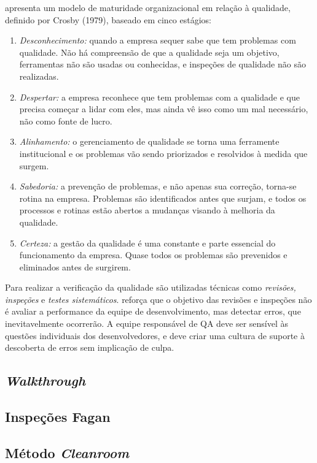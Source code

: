 \documentclass[
	12pt,				%
	openright,			%
	oneside,			%
	a4paper,			%
	english,			%
	brazil,				%
	]{abntex2}
\begin{document}
 apresenta um modelo de maturidade organizacional em relação à qualidade, definido por Crosby (1979), baseado em cinco estágios:
\begin{enumerate}
    \item \emph{Desconhecimento:} quando a empresa sequer sabe que tem problemas com qualidade. Não há compreensão de que a qualidade seja um objetivo, ferramentas não são usadas ou conhecidas, e inspeções de qualidade não são realizadas.
    \item \emph{Despertar:} a empresa reconhece que tem problemas com a qualidade e que precisa começar a lidar com eles, mas ainda vê isso como um mal necessário, não como fonte de lucro.
    \item \emph{Alinhamento:} o gerenciamento de qualidade se torna uma ferramente institucional e os problemas vão sendo priorizados e resolvidos à medida que surgem.
    \item \emph{Sabedoria:} a prevenção de problemas, e não apenas sua correção, torna-se rotina na empresa. Problemas são identificados antes que surjam, e todos os processos e rotinas estão abertos a mudanças visando à melhoria da qualidade.
    \item \emph{Certeza:} a gestão da qualidade é uma constante e parte essencial do funcionamento da empresa. Quase todos os problemas são prevenidos e eliminados antes de surgirem.
\end{enumerate}

Para realizar a verificação da qualidade são utilizadas técnicas como \emph{revisões, inspeções} e \emph{testes sistemáticos}.  reforça que o objetivo das revisões e inspeções não é avaliar a performance da equipe de desenvolvimento, mas detectar erros, que inevitavelmente ocorrerão. A equipe responsável de QA deve ser sensível às questões individuais dos desenvolvedores, e deve criar uma cultura de suporte à descoberta de erros sem implicação de culpa.

\subsection{\emph{Walkthrough}}


\subsection{Inspeções Fagan}


\subsection{Método \emph{Cleanroom}}
\end{document}
